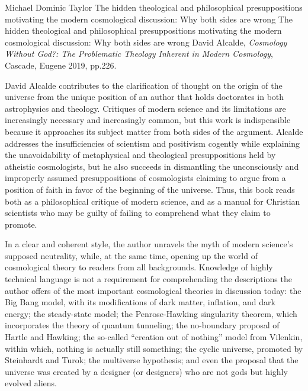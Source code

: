 \begin{recengenv}{Michael Dominic Taylor}
	{The hidden theological and philosophical presuppositions motivating the modern cosmological discussion: Why both sides are wrong}
	{The hidden theological and philosophical presuppositions motivating the modern cosmological discussion: Why both sides are wrong}
	{David Alcalde, \textit{Cosmology Without God?: The Problematic Theology Inherent in Modern Cosmology}, Cascade, Eugene 2019, pp.226.}





David Alcalde contributes to the clarification of thought on the origin of the universe from the unique position of an author that holds doctorates in both astrophysics and theology. Critiques of modern science and its limitations are increasingly necessary and increasingly common, but this work is indispensible because it approaches its subject matter from both sides of the argument. Alcalde addresses the insufficiencies of scientism and positivism cogently while explaining the unavoidability of metaphysical and theological presuppositions held by atheistic cosmologists, but he also succeeds in dismantling the unconsciously and improperly assumed presuppositions of cosmologists claiming to argue from a position of faith in favor of the beginning of the universe. Thus, this book reads both as a philosophical critique of modern science, and as a manual for Christian scientists who may be guilty of failing to comprehend what they claim to promote.

In a clear and coherent style, the author unravels the myth of modern science's supposed neutrality, while, at the same time, opening up the world of cosmological theory to readers from all backgrounds. Knowledge of highly technical language is not a requirement for comprehending the descriptions the author offers of the most important cosmological theories in discussion today: the Big Bang model, with its modifications of dark matter, inflation, and dark energy; the steady-state model; the Penrose-Hawking singularity theorem, which incorporates the theory of quantum tunneling; the no-boundary proposal of Hartle and Hawking; the so-called ``creation out of nothing'' model from Vilenkin, within which, nothing is actually still something; the cyclic universe, promoted by Steinhardt and Turok; the multiverse hypothesis; and even the proposal that the universe was created by a designer (or designers) who are not gods but highly evolved aliens.


\end{recengenv}
